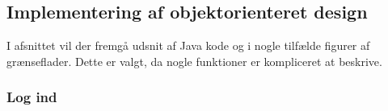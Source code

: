 \subsection{Implementering af objektorienteret design}
I afsnittet vil der fremgå udsnit af Java kode og i nogle tilfælde figurer af grænseflader. Dette er valgt, da nogle funktioner er kompliceret at beskrive. 

\subsubsection*{Log ind}